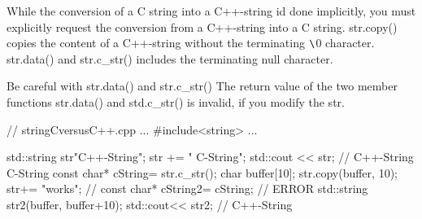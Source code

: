 
While the conversion of a C string into a C++-string id done implicitly, you must explicitly request the conversion from a C++-string into a C string. str.copy() copies the content of a C++-string without the terminating $ \verb|\|$0 character. str.data() and str.c\_str() includes the terminating null character.

\begin{myWarning}{Be careful with str.data() and str.c\_str()}
The return value of the two member functions str.data() and std.c\_str() is invalid, if you modify the str.


\begin{cpp}
// stringCversusC++.cpp
...
#include<string>
...

std::string str{"C++-String"};
str += " C-String";
std::cout << str; // C++-String C-String
const char* cString= str.c_str();
char buffer[10];
str.copy(buffer, 10);
str+= "works";
// const char* cString2= cString; // ERROR
std::string str2(buffer, buffer+10);
std::cout<< str2; // C++-String
\end{cpp}
\end{myWarning}































